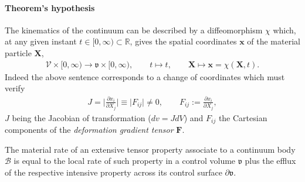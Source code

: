 \paragraph{Theorem's hypothesis}
The kinematics of the continuum can be described by a diffeomorphism
$\chi$ which, at any given instant $t\in [0,\infty)\subset\mathbb{R}$,
  gives the spatial coordinates $\mathbf{x}$ of the material particle
  $\mathbf{X}$,
\begin{align*}
\mathscr{V}\times[0,\infty)\rightarrow \mathfrak{v}\times[0,\infty),
    \qquad t \mapsto t, \qquad
    \mathbf{X}\mapsto\mathbf{x}=\chi(\mathbf{X},t).
\end{align*}
Indeed the above sentence corresponds to a change of coordinates which
must verify
\begin{align*}
J=\bigg\vert\frac{\partial{x}_i}{\partial{X}_j}\bigg\vert\equiv
\big\vert{F_{ij}}\big\vert\neq{0}, \qquad
F_{ij}:=\frac{\partial{x}_i}{\partial{X}_j},
\end{align*}
$J$ being the Jacobian of transformation ($dv=JdV$) and $F_{ij}$ the Cartesian
components of the {\em deformation gradient tensor} $\mathbf{F}$.

 The material rate of an extensive tensor property
associate to a continuum body $\mathscr{B}$ is equal to the local rate
of such property in a control volume $\mathfrak{v}$ plus the efflux of
the respective intensive property across its control surface
$\partial\mathfrak{v}$.

